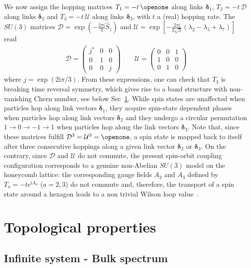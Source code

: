 \documentclass[aps,pra,showpacs,twocolumn,superscriptaddress]{revtex4-1}
\newcommand{\imag}{\mathrm{i}}
\begin{document}
We now assign the hopping matrices $T_1=-t \,\openone$ along links $\bm{\delta}_1$, $T_2=-t \,\mathcal{D}$ 
along links $\bm{\delta}_2$ and 
$T_3=-t \, \mathcal{U}$ along links $\bm{\delta}_3$, with 
$t$ a (real) hopping rate. 
The $SU(3)$ matrices $\mathcal{D}=\exp{(-\frac{2\pi \imag}{3}\hat{S}_z)}$ and 
$\mathcal{U}=\exp{\left[-\frac{2\pi \imag}{3\sqrt{3}}\left(\lambda_2-\lambda_5+\lambda_7\right)\right]}$ read
\begin{align}
\mathcal{D}=  \left(
					\begin{matrix}
						j^* & 0 & 0\\
						0 & 1 & 0\\
						0 & 0 & j
					\end{matrix}
				\right) \quad \quad
	\mathcal{U}=\left(
					\begin{matrix}
						0 & 0 & 1\\
						1 & 0 & 0\\
						0 & 1 & 0
					\end{matrix}
				\right)
\end{align}
where $j=\exp(2\imag \pi/3)$. From these expressions, one can check that $T_3$  is breaking time
reversal symmetry, which gives rise to a band structure with non-vanishing Chern number, see below Sec~\ref{sec:topo}. 
While spin states are unaffected when particles hop along link vectors $\bm{\delta}_1$, 
they acquire spin-state dependent phases when particles hop along link vectors $\bm{\delta}_2$ 
and they undergo a circular permutation $1 \to 0 \to -1 \to 1$ when particles hop along the link vectors $\bm{\delta}_3$.
Note that, since these matrices fulfill $\mathcal{D}^3 = \mathcal{U}^3 = \openone$, a spin state is mapped back
to itself after three consecutive hoppings along a given link vector $\bm{\delta}_2$ or $\bm{\delta}_3$.
On the contrary, since $\mathcal{D}$ and $\mathcal{U}$ do not commute,  the present spin-orbit coupling configuration 
corresponds to a genuine non-Abelian $SU(3)$ model on the honeycomb lattice: the
corresponding gauge fields $A_2$ and $A_3$ defined by $T_a=-t e^{\imag A_a}$ ($a = 2,3$) do not commute and,
therefore, the transport of a spin state around a hexagon leads to a non trivial Wilson loop value~\cite{Bermudez2010}.

\section{Topological properties}
\label{sec:topo}
\subsection{Infinite system - Bulk spectrum}
\end{document}
